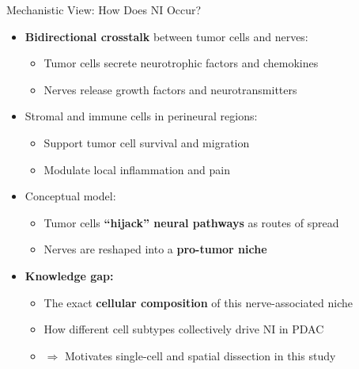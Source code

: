 \documentclass[10pt]{beamer}
\theoremstyle{plain}
\begin{document}
\begin{frame}{Mechanistic View: How Does NI Occur?}
  \begin{itemize}
    \item \textbf{Bidirectional crosstalk} between tumor cells and nerves:
      \begin{itemize}
        \item Tumor cells secrete neurotrophic factors and chemokines
        \item Nerves release growth factors and neurotransmitters
      \end{itemize}
    \item Stromal and immune cells in perineural regions:
      \begin{itemize}
        \item Support tumor cell survival and migration
        \item Modulate local inflammation and pain
      \end{itemize}
    \item Conceptual model:
      \begin{itemize}
        \item Tumor cells \textbf{“hijack” neural pathways} as routes of spread
        \item Nerves are reshaped into a \textbf{pro-tumor niche}
      \end{itemize}
    \item \textbf{Knowledge gap:}
      \begin{itemize}
        \item The exact \textbf{cellular composition} of this nerve-associated niche
        \item How different cell subtypes collectively drive NI in PDAC
        \item \(\Rightarrow\) Motivates single-cell and spatial dissection in this study
      \end{itemize}
  \end{itemize}
\end{frame}
\end{document}
